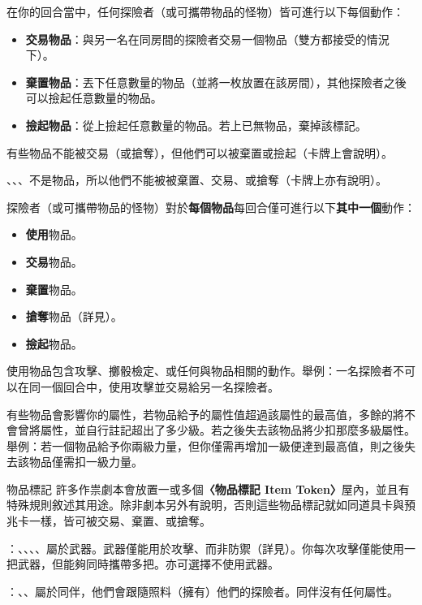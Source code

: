 在你的回合當中，任何探險者（或可攜帶物品的怪物）皆可進行以下每個動作：
\begin{itemize}
  \item \textbf{交易物品}：與另一名在同房間的探險者交易一個物品（雙方都接受的情況下）。
  \item \textbf{棄置物品}：丟下任意數量的物品（並將一枚放置在該房間），其他探險者之後可以撿起任意數量的物品。
  \item \textbf{撿起物品}：從上撿起任意數量的物品。若上已無物品，棄掉該標記。
\end{itemize}
有些物品不能被交易（或搶奪），但他們可以被棄置或撿起（卡牌上會說明）。

、、、不是物品，所以他們不能被被棄置、交易、或搶奪（卡牌上亦有說明）。

探險者（或可攜帶物品的怪物）對於\textbf{每個物品}每回合僅可進行以下\textbf{其中一個}動作：
\begin{itemize}
  \item \textbf{使用}物品。
  \item \textbf{交易}物品。
  \item \textbf{棄置}物品。
  \item \textbf{搶奪}物品（詳見）。
  \item \textbf{撿起}物品。
\end{itemize}
使用物品包含攻擊、擲骰檢定、或任何與物品相關的動作。舉例：一名探險者不可以在同一個回合中，使用攻擊並交易給另一名探險者。

有些物品會影響你的屬性，若物品給予的屬性值超過該屬性的最高值，多餘的將不會曾將屬性，並自行註記超出了多少級。若之後失去該物品將少扣那麼多級屬性。舉例：若一個物品給予你兩級力量，但你僅需再增加一級便達到最高值，則之後失去該物品僅需扣一級力量。

\begin{RuleBox}{物品標記}
許多作祟劇本會放置一或多個\textbf{〈物品標記 Item Token〉}屋內，並且有特殊規則敘述其用途。除非劇本另外有說明，否則這些物品標記就如同道具卡與預兆卡一樣，皆可被交易、棄置、或搶奪。
\end{RuleBox}

\textbf{}：、、、、屬於武器。武器僅能用於攻擊、而非防禦（詳見）。你每次攻擊僅能使用一把武器，但能夠同時攜帶多把。亦可選擇不使用武器。

\textbf{}：、、屬於同伴，他們會跟隨照料（擁有）他們的探險者。同伴沒有任何屬性。

